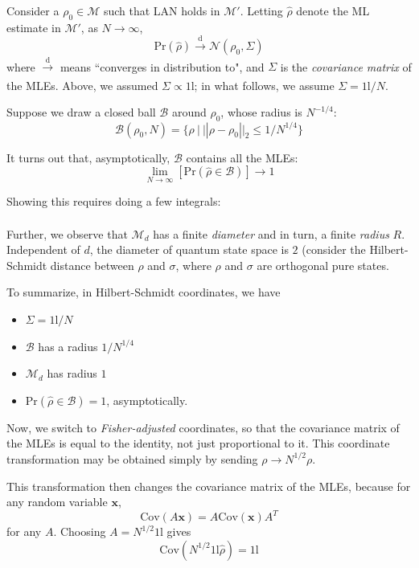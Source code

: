 \documentclass[aps,pra, twocolumn]{revtex4-1}
\newcommand{\bs}[1]{\boldsymbol{#1}}
\newcommand{\M}{\mathcal{M}}
\newcommand{\Id}{\mathbb{I}}
\def\Id{1\!\mathrm{l}}
\begin{document}
Consider a $\rho_{0} \in \M$ such that LAN holds in $\M'$. Letting $\hat{\rho}$ denote the ML estimate in $\M'$, as $N \rightarrow \infty$,
\[\mathrm{Pr}(\hat{\rho})\xrightarrow[]{\text{d}} \mathcal{N}\left(\rho_{0}, \Sigma\right)\]
where $\xrightarrow[]{\text{d}}$ means ``converges in distribution to", and $\Sigma$ is the \emph{covariance matrix} of the MLEs. Above, we assumed $\Sigma \propto \Id$; in what follows, we assume $\Sigma = \Id/N$.

Suppose we draw a closed ball $\mathcal{B}$ around $\rho_{0}$, whose radius is $N^{-1/4}$:
\[\mathcal{B}(\rho_{0}, N) =\{\rho~|~||\rho - \rho_{0}||_{2} \leq 1/N^{1/4}\}\]

It turns out that, asymptotically, $\mathcal{B}$ contains all the MLEs:
 \[\lim_{N \rightarrow \infty}\left[\mathrm{Pr}\left(\hat{\rho} \in \mathcal{B}\right)\right] \rightarrow 1\]

Showing this requires doing a few integrals:
\begin{align*}
\end{align*}
 
Further, we observe that $\M_{d}$ has a finite \emph{diameter} and in turn, a finite \emph{radius} $R$. Independent of $d$, the diameter of quantum state space is $2$ (consider the Hilbert-Schmidt distance between $\rho$ and $\sigma$, where $\rho$ and $\sigma$ are orthogonal pure states.

 To summarize, in Hilbert-Schmidt coordinates, we have
 
 \begin{itemize}
 \item $\Sigma = \Id/N$
 \item $\mathcal{B}$ has a radius $1/N^{1/4}$
 \item $\M_{d}$ has radius $1$
 \item $\mathrm{Pr}\left(\hat{\rho} \in \mathcal{B}\right) = 1$, asymptotically.
 \end{itemize}
 
Now, we switch to \emph{Fisher-adjusted} coordinates, so that the covariance matrix of the MLEs is equal to the identity, not just proportional to it. This coordinate transformation may be obtained simply by sending $\rho \rightarrow N^{1/2}\rho$.

This transformation then changes the covariance matrix of the MLEs, because for any random variable $\bs{x}$,
\[\mathrm{Cov}(A\bs{x}) = A\mathrm{Cov}(\bs{x})A^{T} \]
for any $A$. Choosing $A = N^{1/2}\Id$ gives
\[\mathrm{Cov}(N^{1/2}\Id\hat{\rho}) = \Id\]
\end{document}
